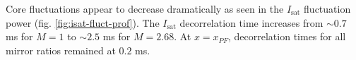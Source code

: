 
Core fluctuations appear to decrease dramatically as seen in the $I_\text{sat}$ fluctuation power (fig. \ref{fig:isat-fluct-prof}). The $I_\text{sat}$ decorrelation time increases from $\sim0.7$ ms for $M=1$ to $\sim2.5$ ms for $M=2.68$. At $x=x_{PF}$, decorrelation times for all mirror ratios remained at $0.2$ ms.

